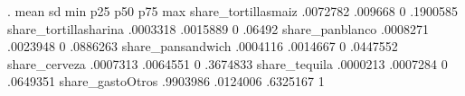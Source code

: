 	.						
	mean	sd	min	p25	p50	p75	max
share_tortillasmaiz	.0072782	.009668	0				.1900585
share_tortillasharina	.0003318	.0015889	0				.06492
share_panblanco	.0008271	.0023948	0				.0886263
share_pansandwich	.0004116	.0014667	0				.0447552
share_cerveza	.0007313	.0064551	0				.3674833
share_tequila	.0000213	.0007284	0				.0649351
share_gastoOtros	.9903986	.0124006	.6325167				1
